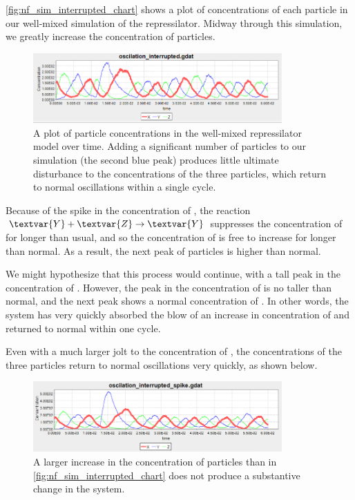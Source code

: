 \autoref{fig:nf_sim_interrupted_chart} shows a plot of concentrations of each particle in our well-mixed simulation of the repressilator.  Midway through this simulation, we greatly increase the concentration of  particles.

\begin{figure}[h]
\centering
\mySfFamily
\includegraphics[width = 0.85\textwidth]{../images/nf_sim_interrupted_chart.png}
\caption{A plot of particle concentrations in the well-mixed repressilator model over time. Adding a significant number of  particles to our simulation (the second blue peak) produces little ultimate disturbance to the concentrations of the three particles, which return to normal oscillations within a single cycle.}
\label{fig:nf_sim_interrupted_chart}
\end{figure}

Because of the spike in the concentration of , the reaction $\textvar{Y} + \textvar{Z} \rightarrow \textvar{Y}$ suppresses the concentration of  for longer than usual, and so the concentration of  is free to increase for longer than normal. As a result, the next peak of  particles is higher than normal.

We might hypothesize that this process would continue, with a tall peak in the concentration of . However, the peak in the concentration of  is no taller than normal, and the next peak shows a normal concentration of . In other words, the system has very quickly absorbed the blow of an increase in concentration of  and returned to normal within one cycle.

Even with a much larger jolt to the concentration of , the concentrations of the three particles return to normal oscillations very quickly, as shown below.\\

\begin{figure}[h]
\centering
\mySfFamily
\includegraphics[width = 0.85\textwidth]{../images/nf_sim_interrupted_chart_spike.png}
\caption{A larger increase in the concentration of  particles than in \autoref{fig:nf_sim_interrupted_chart} does not produce a substantive change in the system.}
\label{fig:nf_sim_interrupted_chart_spike}
\end{figure}

